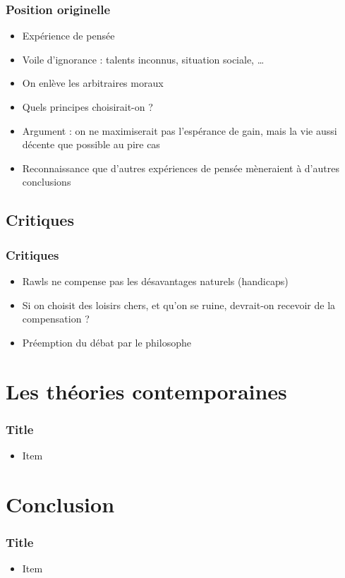 \documentclass[french]{beamer}
\begin{document}
\begin{frame}
	\frametitle{Position originelle}
	\begin{itemize}
		\item Expérience de pensée
		\item Voile d’ignorance : talents inconnus, situation sociale, …
		\item On enlève les arbitraires moraux
		\item Quels principes choisirait-on ?
		\item Argument : on ne maximiserait pas l’espérance de gain, mais la vie aussi décente que possible au pire cas
		\item Reconnaissance que d’autres expériences de pensée mèneraient à d’autres conclusions
	\end{itemize}
\end{frame}

\subsection{Critiques}
\begin{frame}
	\frametitle{Critiques}
	\begin{itemize}
		\item Rawls ne compense pas les désavantages naturels (handicaps)
    \item Si on choisit des loisirs chers, et qu’on se ruine, devrait-on recevoir de la compensation ? 
    \item Préemption du débat par le philosophe \citep{estlund_democratic_2009}
	\end{itemize}
\end{frame}

\section{Les théories contemporaines}
\begin{frame}
	\frametitle{Title}
	\begin{itemize}
		\item Item
	\end{itemize}
\end{frame}

\section{Conclusion}
\begin{frame}
	\frametitle{Title}
	\begin{itemize}
		\item Item
	\end{itemize}
\end{frame}
\end{document}
